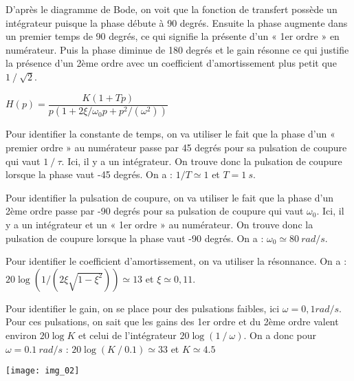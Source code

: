 \ifprof
\begin{corrige}
D’après le diagramme de Bode, on voit que la fonction de transfert possède un intégrateur puisque la phase débute à 90 degrés. Ensuite la phase augmente dans un premier temps de 90 degrés, ce qui signifie la présente d’un « 1er ordre » en numérateur. Puis la phase diminue de 180 degrés  et le gain résonne ce qui justifie la présence d’un 2ème ordre avec un coefficient d’amortissement plus petit que $1⁄\sqrt{2}$.

$H(p)=\dfrac{K(1+Tp)}{p(1+2\xi/\omega_0  p+p^2/(\omega^2 ))}$

Pour identifier la constante de temps, on va utiliser le fait que la phase d’un « premier ordre » au numérateur passe par 45 degrés pour sa pulsation de coupure qui vaut $1⁄\tau$.
Ici, il y a un intégrateur. On trouve donc la pulsation de coupure lorsque la phase vaut -45 degrés. On a :
$1/T\simeq 1$ et $T=\SI{1}{s}$.

Pour identifier la pulsation de coupure, on va utiliser le fait que la phase d’un 2ème ordre passe par -90 degrés pour sa pulsation de coupure qui vaut $\omega_0$.
Ici, il y a un intégrateur et un « 1er ordre » au numérateur. On trouve donc la pulsation de coupure lorsque la phase vaut -90 degrés. On a :
$\omega_0\simeq \SI{80}{rad/s}$.

Pour identifier le coefficient d’amortissement, on va utiliser la résonnance. On a :
$20\log(1/(2\xi\sqrt{1-\xi^2 }))\simeq 13$ et $\xi\simeq 0,11$.

Pour identifier le gain, on se place pour des pulsations faibles, ici $\omega=0,1 rad/s$. Pour ces pulsations, on sait que les gains des 1er ordre et du 2ème ordre valent environ $20\log K$ et celui de l’intégrateur $20\log(1⁄\omega)$. On a donc pour $\omega=\SI{0,1}{rad/s}$ :
$20\log(K⁄0.1)\simeq 33$ et $K\simeq4.5$

\end{corrige}
\else

\begin{center}
\texttt{[image: img\_02]}
\end{center}
\fi


%
%
%
%

